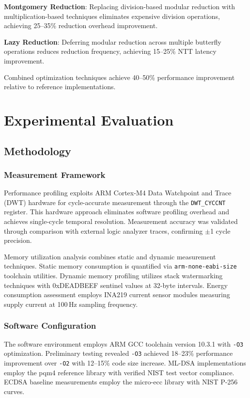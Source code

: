 \documentclass[final, twoside]{IEEEtran} %
\begin{document}
\textbf{Montgomery Reduction}: Replacing division-based modular reduction with multiplication-based techniques eliminates expensive division operations, achieving 25--35\% reduction overhead improvement.

\textbf{Lazy Reduction}: Deferring modular reduction across multiple butterfly operations reduces reduction frequency, achieving 15--25\% NTT latency improvement.

Combined optimization techniques achieve 40--50\% performance improvement relative to reference implementations.

\section{Experimental Evaluation}\label{sec:evaluation}

\subsection{Methodology}\label{sec:methodology}

\subsubsection{Measurement Framework}

Performance profiling exploits ARM Cortex-M4 Data Watchpoint and Trace (DWT) hardware for cycle-accurate measurement through the \texttt{DWT\_CYCCNT} register. This hardware approach eliminates software profiling overhead and achieves single-cycle temporal resolution. Measurement accuracy was validated through comparison with external logic analyzer traces, confirming $\pm$1 cycle precision.

Memory utilization analysis combines static and dynamic measurement techniques. Static memory consumption is quantified via \texttt{arm-none-eabi-size} toolchain utilities. Dynamic memory profiling utilizes stack watermarking techniques with 0xDEADBEEF sentinel values at 32-byte intervals. Energy consumption assessment employs INA219 current sensor modules measuring supply current at 100\,Hz sampling frequency.

\subsubsection{Software Configuration}

The software environment employs ARM GCC toolchain version 10.3.1 with \texttt{-O3} optimization. Preliminary testing revealed \texttt{-O3} achieved 18--23\% performance improvement over \texttt{-O2} with 12--15\% code size increase. ML-DSA implementations employ the pqm4 reference library with verified NIST test vector compliance. ECDSA baseline measurements employ the micro-ecc library with NIST P-256 curves.
\end{document}
